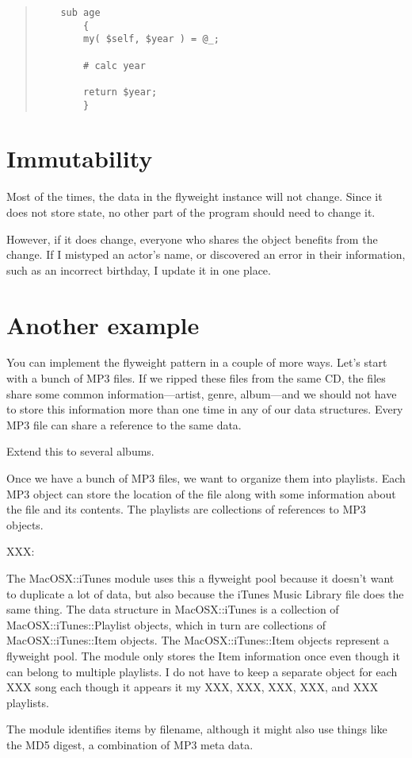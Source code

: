 \begin{quote}
\begin{verbatim}
	sub age
		{
		my( $self, $year ) = @_;
		
		# calc year
		
		return $year;
		}
\end{verbatim}
\end{quote}
		
	\section{Immutability}

Most of the times, the data in the flyweight instance will not 
change.  Since it does not store state, no other part of the
program should need to change it.

However, if it does change, everyone who shares the object benefits
from the change.  If I mistyped an actor's name, or discovered an
error in their information, such as an incorrect birthday, I update
it in one place. 

	
	\section{Another example}
	
You can implement the flyweight pattern in a couple of more ways.
Let's start with a bunch of MP3 files.  If we ripped these files
from the same CD, the files share some common information---artist,
genre, album---and we should not have to store this information
more than one time in any of our data structures.  Every MP3 file
can share a reference to the same data.


Extend this to several albums.

Once we have a bunch of MP3 files, we want to organize them into
playlists.  Each MP3 object can store the location of the file
along with some information about the file and its contents.  The
playlists are collections of references to MP3 objects.

XXX:

The MacOSX::iTunes module uses this a flyweight pool because it
doesn't want to duplicate a lot of data, but also because the iTunes
Music Library file does the same thing.  The data structure in MacOSX::iTunes
is a collection of MacOSX::iTunes::Playlist objects, which in turn are 
collections of MacOSX::iTunes::Item objects.  The MacOSX::iTunes::Item objects
represent a flyweight pool.  The module only stores the Item information
once even though it can belong to multiple playlists.  I do not have to
keep a separate object for each XXX song each though it appears it my
XXX, XXX, XXX, XXX, and XXX playlists.

The module identifies items by filename, although it might also use things
like the MD5 digest, a combination of MP3 meta data.
